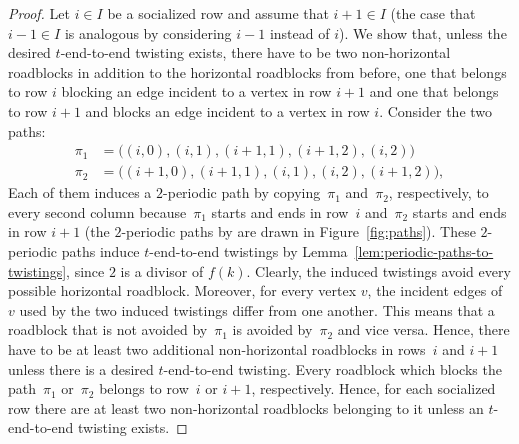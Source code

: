 \documentclass[a4paper,english, thm-restate]{lipics-v2021}
\begin{document}
\begin{proof}
	Let $i\in I$ be a socialized row
	and assume that $i+1 \in I$ (the case that $i-1 \in I$
	is analogous by considering $i-1$ instead of $i$).
	We show that,
	unless the desired $t$-end-to-end twisting exists,
	there have to be two non-horizontal roadblocks in addition to the horizontal roadblocks from before,
	one that belongs to row $i$ blocking an edge incident to a vertex in row $i+1$
	and one that belongs to row $i+1$ and blocks an edge incident to a vertex in row $i$.
	Consider the two paths:
		\begin{align*}
		\pi_1&= \big((i,0),(i,1),(i+1,1),(i+1,2),(i,2)\big)\\
		\pi_2&= \big((i+1,0),(i+1,1),(i,1),(i,2),(i+1,2)\big),
	\end{align*}
	Each of them induces a $2$-periodic path by  copying~$\pi_1$ and~$\pi_2$, respectively, to every second column because~$\pi_1$ starts and ends in row~$i$ and~$\pi_2$ starts and ends in row $i+1$ (the $2$-periodic paths by are drawn in Figure~\ref{fig:paths}).
	These $2$\nobreakdash-periodic paths induce $t$\nobreakdash-end-to-end twistings
	by Lemma~\ref{lem:periodic-paths-to-twistings}, since $2$ is a divisor of $f(k)$. Clearly, the induced twistings
 avoid every possible horizontal roadblock.
 Moreover, for every vertex $v$, the incident edges of $v$ used by the two induced twistings differ from one another.
	This means that a roadblock that is not avoided by~$\pi_1$
	is avoided by~$\pi_2$ and vice versa.
	Hence, there have to be at least two additional non-horizontal roadblocks
	in rows~$i$ and $i+1$
	unless there is a desired $t$\nobreakdash-end-to-end twisting.
	Every roadblock which blocks the path~$\pi_1$ or~$\pi_2$
	belongs to row~$i$ or $i+1$, respectively.
	Hence,  for each socialized row there are at least two non-horizontal roadblocks belonging to it unless an $t$-end-to-end twisting exists.
	

\end{proof}
\end{document}
